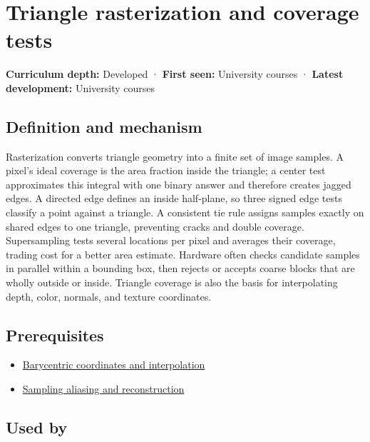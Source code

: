 \hypertarget{appendix-ed3f9bc298fe}{}\label{referencestart:appendix-ed3f9bc298fe}
\section{Triangle rasterization and coverage tests}\label{appendix-ed3f9bc298fe-triangle-rasterization-and-coverage-tests}

\textbf{Curriculum depth:} Developed · \textbf{First seen:} University courses · \textbf{Latest development:} University courses

\subsection{Definition and mechanism}\label{appendix-ed3f9bc298fe-definition-and-mechanism}

Rasterization converts triangle geometry into a finite set of image samples. A pixel's ideal coverage is the area fraction inside the triangle; a center test approximates this integral with one binary answer and therefore creates jagged edges. A directed edge defines an inside half-plane, so three signed edge tests classify a point against a triangle. A consistent tie rule assigns samples exactly on shared edges to one triangle, preventing cracks and double coverage. Supersampling tests several locations per pixel and averages their coverage, trading cost for a better area estimate. Hardware often checks candidate samples in parallel within a bounding box, then rejects or accepts coarse blocks that are wholly outside or inside. Triangle coverage is also the basis for interpolating depth, color, normals, and texture coordinates.

\subsection{Prerequisites}\label{appendix-ed3f9bc298fe-prerequisites}

\begin{itemize}
\tightlist
\item
  \hyperref[appendix-02b9d9a81dca]{Barycentric coordinates and interpolation}
\item
  \hyperref[appendix-6a7869dd79a6]{Sampling aliasing and reconstruction}
\end{itemize}

\subsection{Used by}\label{appendix-ed3f9bc298fe-used-by}

